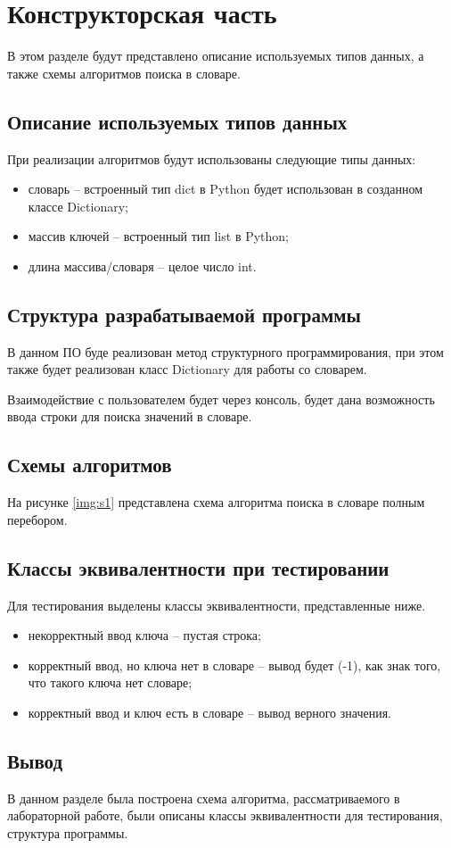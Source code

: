 
\chapter{Конструкторская часть}
В этом разделе будут представлено описание используемых типов данных,
а также схемы алгоритмов поиска в словаре.

\section{Описание используемых типов данных}
При реализации алгоритмов будут использованы следующие типы данных:
\begin{itemize}
	\item словарь -- встроенный тип dict \cite{pythondict} в Python\cite{pythonlang} будет использован в созданном классе Dictionary;
	\item массив ключей -- встроенный тип list \cite{pythonlist} в Python\cite{pythonlang};
	\item длина массива/словаря -- целое число int.
\end{itemize}

\section{Структура разрабатываемой программы}
В данном ПО буде реализован метод структурного программирования, при этом также будет реализован класс Dictionary для работы со словарем.

Взаимодействие с пользователем будет через консоль, будет дана возможность ввода строки для поиска значений в словаре.

\section{Схемы алгоритмов}
На рисунке \ref{img:s1} представлена схема алгоритма поиска в словаре полным перебором.

\clearpage


\section{Классы эквивалентности при тестировании}
Для тестирования выделены классы эквивалентности, представленные ниже.
\begin{itemize}
	\item некорректный ввод ключа -- пустая строка;
	\item корректный ввод, но ключа нет в словаре -- вывод будет (-1), как знак того, что такого ключа нет словаре;
	\item корректный ввод и ключ есть в словаре -- вывод верного значения.
\end{itemize}

\section*{Вывод}
В данном разделе была построена схема алгоритма, рассматриваемого в лабораторной работе, были описаны классы эквивалентности для тестирования, структура программы.